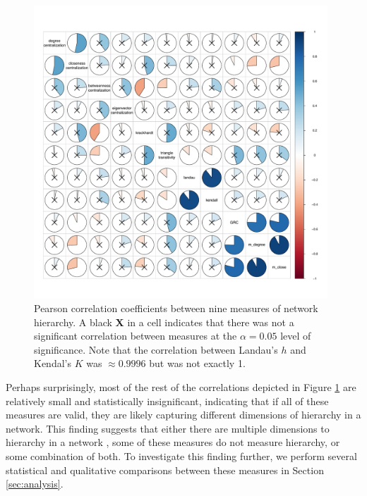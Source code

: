 \documentclass[3p,times]{elsarticle}
\begin{document}
\begin{figure}
\begin{center}
	\caption{\label{fig:measure correlations} Pearson correlation coefficients between nine measures of network hierarchy. A black \textbf{X} in a cell indicates that there was not a significant correlation between measures at the $\alpha = 0.05$ level of significance. Note that the correlation between Landau's $h$ and Kendal's $K$ was $\approx 0.9996$ but was not exactly 1.}
		\includegraphics[width = 0.98\textwidth]{./images/Global_Measure_Correlations_with_Tests.pdf}
\end{center}
\end{figure}

Perhaps surprisingly, most of the rest of the correlations depicted in Figure \ref{fig:measure correlations} are relatively small and statistically insignificant, indicating that if all of these measures are valid, they are likely capturing different dimensions of hierarchy in a network. This finding suggests that either there are multiple dimensions to hierarchy in a network \cite{Corominas-Murtra2013}, some of these measures do not measure hierarchy, or some combination of both. To investigate this finding further, we perform several statistical and qualitative comparisons between these measures in Section \ref{sec:analysis}.
	
\end{document}
